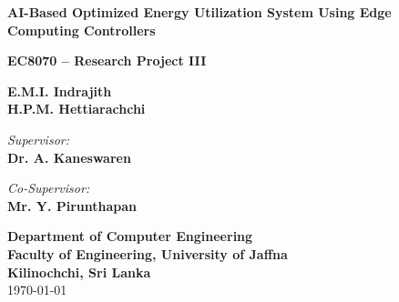 \documentclass[12pt, a4paper]{article}
\begin{document}
\begin{titlepage}
    \centering
    \vspace*{2cm}
    
    \Huge
    \textbf{AI-Based Optimized Energy Utilization System Using Edge Computing Controllers}
    
    \vspace{1.5cm}
    
    \Large
    \textbf{EC8070 -- Research Project III}
    
    \vspace{2cm}
    
    \Large
    \textbf{E.M.I. Indrajith}\\
    \textbf{H.P.M. Hettiarachchi}
    
    \vspace{1.5cm}
    
    \textit{Supervisor:}\\
    \textbf{Dr. A. Kaneswaren}
    
    \vspace{0.5cm}
    \textit{Co-Supervisor:}\\
    \textbf{Mr. Y. Pirunthapan}
    
    \vfill
    
    \Large
    \textbf{Department of Computer Engineering}\\
    \textbf{Faculty of Engineering, University of Jaffna}\\
    \textbf{Kilinochchi, Sri Lanka}\\
    \vspace{0.8cm}
    \today
    
\end{titlepage}
\end{document}
